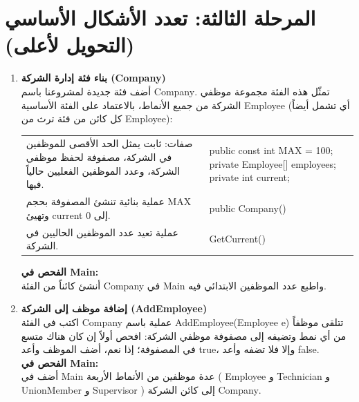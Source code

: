\documentclass[14pt]{extarticle}
\begin{document}
\clearpage

\section*{المرحلة الثالثة: تعدد الأشكال الأساسي (التحويل لأعلى)}

\begin{enumerate}[resume, label=\textbf{تمرين \arabic*:}, wide=0pt, leftmargin=*, itemsep=2em]

    \item \textbf{بناء فئة إدارة الشركة (\textenglish{Company})} \\
    أضف فئة جديدة لمشروعنا باسم \textenglish{Company}. تمثّل هذه الفئة مجموعة موظفي الشركة من جميع الأنماط، بالاعتماد على الفئة الأساسية \textenglish{Employee} (أي تشمل أيضاً كل كائن من فئة ترث من \textenglish{Employee}):

    {\centering
    \renewcommand{\arraystretch}{1.2}
    \small
    \begin{tabular}{|>{\raggedleft\arraybackslash}p{}|>{\raggedright\arraybackslash}p{}|}
    \hline
    \multicolumn{2}{|c|}{\textbf{الفئة: \textenglish{Company}}} \\
    \hline
    صفات: ثابت يمثل الحد الأقصى للموظفين في الشركة، مصفوفة لحفظ موظفي الشركة، وعدد الموظفين الفعليين حالياً فيها. & \textenglish{public const int MAX = 100;} \newline \textenglish{private Employee[] employees;} \newline \textenglish{private int current;} \\
    \hline
    عملية بنائية تنشئ المصفوفة بحجم \textenglish{MAX} وتهيئ \textenglish{current} إلى \textenglish{0}. & \textenglish{public Company()} \\
    \hline
    عملية تعيد عدد الموظفين الحاليين في الشركة. & \textenglish{GetCurrent()} \\
    \hline
    \end{tabular}
    \par} %

    \vspace{2em}
    \noindent \textbf{الفحص في \textenglish{Main}:} \\
    أنشئ كائناً من الفئة \textenglish{Company} في \textenglish{Main} واطبع عدد الموظفين الابتدائي فيه.

    \item \textbf{إضافة موظف إلى الشركة (\textenglish{AddEmployee})} \\
    اكتب في الفئة \textenglish{Company} عملية باسم \textenglish{AddEmployee(Employee e)} تتلقى موظفاً من أي نمط وتضيفه إلى مصفوفة موظفي الشركة: افحص أولاً إن كان هناك متسع في المصفوفة؛ إذا نعم، أضف الموظف وأعد \textenglish{true}، وإلا فلا تضفه وأعد \textenglish{false}. \\
    \textbf{الفحص في \textenglish{Main}:} \\
    أضف في \textenglish{Main} عدة موظفين من الأنماط الأربعة ( \textenglish{Employee} و \textenglish{Technician} و \textenglish{UnionMember} و \textenglish{Supervisor} ) إلى كائن الشركة \textenglish{Company}.


\end{enumerate}
\end{document}
